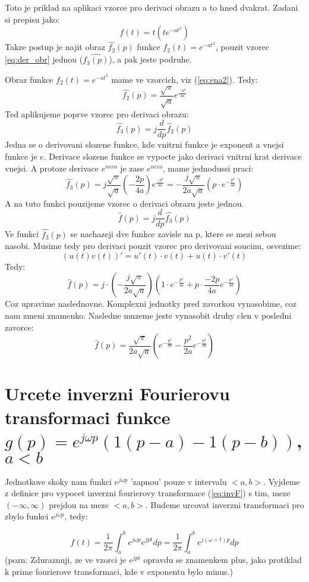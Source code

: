Toto je priklad na aplikaci vzorce pro derivaci obrazu a to hned dvakrat. Zadani si prepisu jako:
$$f(t)=t (t e^{-at^2})$$
Takze postup je najit obraz $\hat{f_2}(p)$ funkce $f_2(t) = e^{-at^2}$, pouzit vzorec \ref{eq:der_obr} jednou ($\hat{f_3(p)}$), a pak jeste podruhe. 

Obraz funkce $f_2(t)  = e^{-at^2}$ mame ve vzorcich, viz (\ref{eq:ena2}). Tedy:
$$\hat{f_2}(p) = \frac{\sqrt{\pi}}{\sqrt{a}}e^{\frac{-p^2}{4a}}$$
Ted aplikujeme poprve vzorec pro derivaci obrazu:
$$\hat{f_3}(p) = j\frac{d}{dp}\hat{f_2}(p)$$
Jedna se o derivovani slozene funkce, kde vnitrni funkce je exponent a vnejsi funkce je $e$. Derivace slozene funkce se vypocte jako derivaci vnitrni krat derivace vnejsi. A protoze derivace $e^{neco}$ je zase $e^{neco}$, mame jednodussi praci:
$$\hat{f_3}(p) = j \frac{\sqrt{\pi}}{\sqrt{a}} \left(-\frac{2p}{4a}\right) e^{\frac{-p^2}{4a}}= -\frac{j\sqrt{\pi}}{2a\sqrt{a}}(p\cdot e^{-\frac{p^2}{4a}})$$
A na tuto funkci pouzijeme vzorec o derivaci obrazu jeste jednou. 
$$\hat{f}(p) = j \frac{d}{dp}\hat{f_3}(p)$$
Ve funkci $\hat{f_3}(p)$ se nachazeji dve funkce zavisle na p, ktere se mezi sebou nasobi. Musime tedy pro derivaci pouzit vzorec pro derivovani soucinu, osvezime:
$$(u(t)v(t))' = u'(t)\cdot v(t)+u(t)\cdot v'(t)$$
Tedy:
$$\hat{f}(p) = j\cdot \left(-\frac{j\sqrt{\pi}}{2a\sqrt{a}} \right) \left( 1\cdot e^{-\frac{p^2}{4a}}+ p \cdot \frac{-2p}{4a}e^{-\frac{p^2}{4a}} \right)$$
Coz upravime naslednovne. Komplexni jednotky pred zavorkou vynasobime, coz nam zmeni znamenko. Nasledne muzeme jeste vynasobit druhy clen v posledni zavorce:
$$\hat{f}(p) = \frac{\sqrt{\pi}}{2a\sqrt{a}} \left(e^{-\frac{p^2}{4a}}- \frac{p^2}{2a}e^{-\frac{p^2}{4a}} \right)$$

\newpage

\section{Urcete inverzni Fourierovu transformaci funkce $g(p)=e^{j\omega p}(1(p-a)-1(p-b))$, $a<b$}

Jednotkove skoky nam funkci $e^{j\omega p}$ 'zapnou' pouze v intervalu $<a,b>$. Vyjdeme z definice pro vypocet inverzni fourierovy transformace (\ref{eq:invF}) s tim, meze $(-\infty,\infty)$ prejdou na meze $<a,b>$. Budeme urcovat inverzni transformaci pro zbylo funkci $e^{j\omega p}$, tedy:

$$f(t) = \frac{1}{2\pi} \int_a^b e^{j\omega p} e^{jpt}dp = \frac{1}{2\pi}\int_a^b e^{j(\omega+t)p}dp$$
(pozn: Zduraznuji, ze ve vzorci je $e^{jpt}$ opravdu se znamenkem plus, jako protiklad k prime fourierove transformaci, kde v exponentu bylo minus.)


